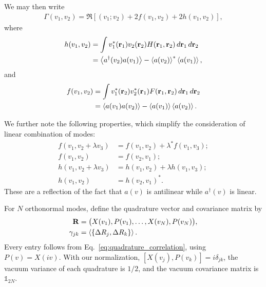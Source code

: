\documentclass[%
 reprint,
 amsmath,amssymb,
 aps,
pra,
twocolumn,
]{revtex4-2}
\begin{document}
We may then write
\begin{equation}
    \label{eq:quadrature_correlation}
    \begin{aligned}
        \Gamma(v_1, v_2) = \Re\left[(v_1; v_2) + 2f(v_1, v_2) + 2h(v_1, v_2)\right],
    \end{aligned}
\end{equation}
%
where
%
\begin{equation}
\label{eq:fhdefinitions}
    \begin{aligned}
        h(v_1, v_2) &= \int v_1^*(\mathbf{r}_1) v_2(\mathbf{r}_2)
           H(\mathbf{r}_1, \mathbf{r}_2)\,d\mathbf{r}_1\,d\mathbf{r}_2 \\ &= \expval{a^\dagger(v_2)a(v_1)} - \expval{a(v_2)}^* \expval{a(v_1)},
    \end{aligned}
\end{equation}
and
\begin{equation}
    \begin{aligned}
        f(v_1, v_2) &= \int v_1^*(\mathbf{r}_2) v_2^*(\mathbf{r}_1)
           F(\mathbf{r}_1, \mathbf{r}_2)\,d\mathbf{r}_1\,d\mathbf{r}_2 \\ &= \expval{a(v_1)a(v_2)} - \expval{a(v_1)} \expval{a(v_2)}.
    \end{aligned}
\end{equation}

We further note the following properties, which simplify the consideration of linear combination of modes:
\begin{equation}
    \begin{aligned}
        f(v_1, v_2 + \lambda v_3) &= f(v_1, v_2) + \lambda^* f(v_1, v_3); \\
        f(v_1, v_2) &= f(v_2, v_1); \\
        h(v_1, v_2 + \lambda v_3) &= h(v_1, v_2) + \lambda h(v_1, v_3); \\
        h(v_1, v_2) &= h(v_2, v_1)^*.
    \end{aligned}
\end{equation}
These are a reflection of the fact that $a(v)$ is antilinear while $a^\dagger(v)$ is linear.

For $N$ orthonormal modes, define the quadrature vector and covariance matrix by
\begin{equation}
    \begin{aligned}
        \mathbf R&=\bigl(X(v_1),P(v_1),\ldots,X(v_N),P(v_N)\bigr),\\
        \gamma_{jk}&=\expval{\acomm{\Delta R_j}{\Delta R_k}}.
    \end{aligned}
    \label{eq:multimode_covariance}
\end{equation}
Every entry follows from Eq.~\eqref{eq:quadrature_correlation}, using $P(v)=X(iv)$. With our normalization, $[X(v_j),P(v_k)]=i\delta_{jk}$, the vacuum variance of each quadrature is $1/2$, and the vacuum covariance matrix is $\mathbb 1_{2N}$.
\end{document}
